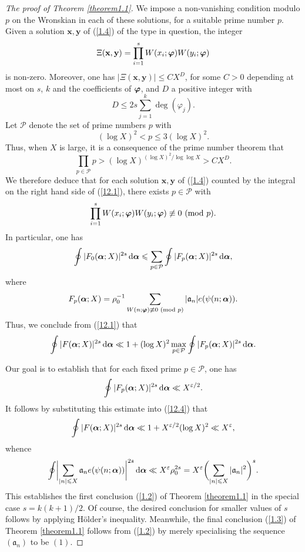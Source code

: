 \documentclass[12pt,reqno]{amsart}
\theoremstyle{definition}
\theoremstyle{remark}
\numberwithin{equation}{section}
\newcommand{\mmod}[1]{\,\,(\text{\rm mod}\,\,#1)}
\def\bfx{{\mathbf x}}
\def\bfy{{\mathbf y}}
\def\calP{{\mathcal P}}
\def\gra{{\mathfrak a}}\def\grA{{\mathfrak A}}\def\bfgra{{\boldsymbol \gra}}
\def\eps{\varepsilon}
\def\le{\leqslant} \def\ge{\geqslant} \def\pleq{\preccurlyeq} \def\ple{\prec}
\def\d{{\,{\rm d}}}
\begin{document}
\begin{proof}[The proof of Theorem \ref{theorem1.1}]
\par We impose a non-vanishing condition modulo $p$ on the Wronskian in each of these 
solutions, for a suitable prime number $p$. Given a solution $\bfx,\bfy$ of (\ref{1.4}) of the 
type in question, the integer
$$\Xi(\bfx,\bfy)=\prod_{i=1}^sW(x_i;\bfvarphi)W(y_i;\bfvarphi)$$
is non-zero. Moreover, one has $|\Xi(\bfx,\bfy)|\le CX^D$, for some $C>0$ depending at 
most on $s$, $k$ and the coefficients of ${\boldsymbol \varphi}$, and $D$ a positive integer with
$$D\le 2s\sum_{j=1}^k\deg(\varphi_j).$$
Let $\calP$ denote the set of prime numbers $p$ with
$$(\log X)^2<p\le 3(\log X)^2.$$
Thus, when $X$ is large, it is a consequence of the prime number theorem that
$$\prod_{p\in \calP}p>(\log X)^{(\log X)^2/\log \log X}>CX^D.$$
We therefore deduce that for each solution $\bfx,\bfy$ of (\ref{1.4}) counted by the 
integral on the right hand side of (\ref{12.1}), there exists $p\in \calP$ with
$$\prod_{i=1}^sW(x_i;\bfvarphi)W(y_i;\bfvarphi)\not \equiv 0\mmod{p}.$$
In particular, one has
$$\oint |F_0(\bfalp;X)|^{2s}\d\bfalp \le \sum_{p\in \calP}\oint |F_p(\bfalp;X)|^{2s}
\d\bfalp ,$$
where
\begin{equation}\label{12.3}
F_p(\bfalp;X)=\rho_0^{-1}\sum_{W(n;\bfvarphi)\not\equiv 0\mmod{p}}|\gra_n|
e(\psi(n;\bfalp)).
\end{equation}
Thus, we conclude from (\ref{12.1}) that
\begin{equation}\label{12.4}
\oint |F(\bfalp;X)|^{2s}\d\bfalp \ll 1+(\log X)^2\max_{p\in \calP}\oint 
|F_p(\bfalp;X)|^{2s}\d\bfalp .
\end{equation}

\par Our goal is to establish that for each fixed prime $p\in \calP$, one has
\begin{equation}\label{12.5}
\oint |F_p(\bfalp;X)|^{2s}\d\bfalp \ll X^{\eps/2 }.
\end{equation}
It follows by substituting this estimate into (\ref{12.4}) that
$$\oint |F(\bfalp;X)|^{2s}\d\bfalp \ll 1+X^{\eps/2}(\log X)^2\ll X^\eps,$$
whence
\begin{equation}\label{12.6}
\oint \biggl| \sum_{|n|\le X}\gra_ne(\psi(n;\bfalp))\biggr|^{2s}\d\bfalp \ll X^\eps
\rho_0^{2s}=X^\eps \biggl( \sum_{|n|\le X}|\gra_n|^2\biggr)^s.
\end{equation}
This establishes the first conclusion (\ref{1.2}) of Theorem \ref{theorem1.1} in the special 
case $s=k(k+1)/2$. Of course, the desired conclusion for smaller values of $s$ follows by 
applying H\"older's inequality. Meanwhile, the final conclusion (\ref{1.3}) of Theorem 
\ref{theorem1.1} follows from (\ref{1.2}) by merely specialising the sequence $(\gra_n)$ 
to be $(1)$.\par


\end{proof}
\end{document}
